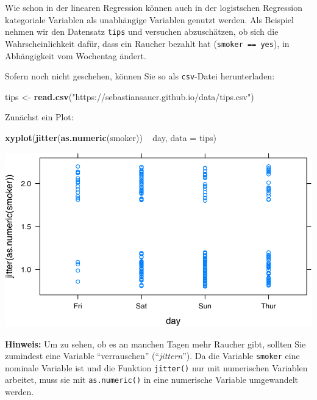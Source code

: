\documentclass[12pt,ngerman,]{book}
\newenvironment{Shaded}{\begin{snugshade}}{\end{snugshade}}
\newcommand{\KeywordTok}[1]{\textcolor[rgb]{0.13,0.29,0.53}{\textbf{{#1}}}}
\newcommand{\DataTypeTok}[1]{\textcolor[rgb]{0.13,0.29,0.53}{{#1}}}
\newcommand{\StringTok}[1]{\textcolor[rgb]{0.31,0.60,0.02}{{#1}}}
\newcommand{\NormalTok}[1]{{#1}}
\renewenvironment{Shaded}{\begin{kframe}}{\end{kframe}}
\begin{document}
Wie schon in der linearen Regression können auch in der logistschen
Regression kategoriale Variablen als unabhängige Variablen genutzt
werden. Als Beispiel nehmen wir den Datensatz \texttt{tips} und
versuchen abzuschätzen, ob sich die Wahrscheinlichkeit dafür, dass ein
Raucher bezahlt hat (\texttt{smoker\ ==\ yes}), in Abhängigkeit vom
Wochentag ändert.

Sofern noch nicht geschehen, können Sie so als \texttt{csv}-Datei
herunterladen:

\begin{Shaded}
\begin{Highlighting}[]
\NormalTok{tips <-}\StringTok{ }\KeywordTok{read.csv}\NormalTok{(}\StringTok{"https://sebastiansauer.github.io/data/tips.csv"}\NormalTok{)}
\end{Highlighting}
\end{Shaded}

Zunächst ein Plot:

\begin{Shaded}
\begin{Highlighting}[]
\KeywordTok{xyplot}\NormalTok{(}\KeywordTok{jitter}\NormalTok{(}\KeywordTok{as.numeric}\NormalTok{(smoker)) ~}\StringTok{ }\NormalTok{day, }\DataTypeTok{data =} \NormalTok{tips)}
\end{Highlighting}
\end{Shaded}

\begin{center}\includegraphics[width=0.7\linewidth]{072_klassifizierende_Regression_files/figure-latex/jitter_tips-1} \end{center}

\textbf{Hinweis:} Um zu sehen, ob es an manchen Tagen mehr Raucher gibt,
sollten Sie zumindest eine Variable ``verrauschen''
(``\emph{jittern}''). Da die Variable \texttt{smoker} eine nominale
Variable ist und die Funktion \texttt{jitter()} nur mit numerischen
Variablen arbeitet, muss sie mit \texttt{as.numeric()} in eine
numerische Variable umgewandelt werden.
\end{document}
